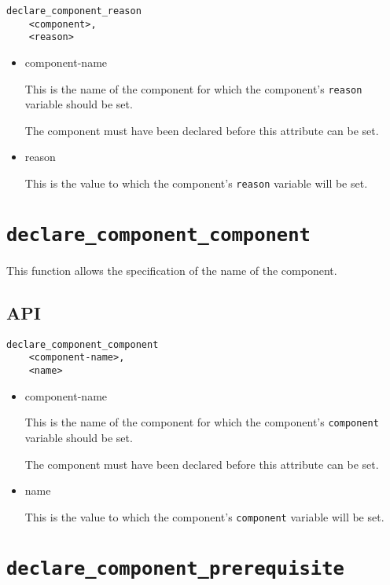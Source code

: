 \begin{verbatim}
declare_component_reason
    <component>,
    <reason>
\end{verbatim}

\begin{itemize}
\item component-name

  This is the name of the component for which the component's
  \texttt{reason} variable should be set.

  The component must have been declared before this attribute can be
  set.

\item reason
  
  This is the value to which the component's \texttt{reason} variable
  will be set.

\end{itemize}

\section{\texttt{declare\_component\_component}}\label{api:component}

This function allows the specification of the name of the component.

\subsection{API}

\begin{verbatim}
declare_component_component
    <component-name>,
    <name>
\end{verbatim}

\begin{itemize}
\item component-name

  This is the name of the component for which the component's
  \texttt{component} variable should be set.

  The component must have been declared before this attribute can be
  set.

\item name

  This is the value to which the component's \texttt{component}
  variable will be set.

\end{itemize}

\section{\texttt{declare\_component\_prerequisite}}\label{api:prerequisite}

